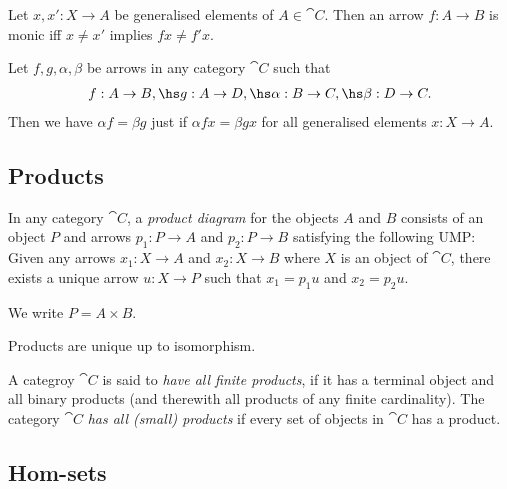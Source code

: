 \documentclass{article}
\begin{document}
\begin{lemma}
	Let $x,x': X\to A$ be generalised elements of $A\in\cat C$. Then an arrow
	$f:A\to B$ is monic iff $x\not=x'$ implies $fx\not=f'x$.
\end{lemma}

\begin{lemma}
	Let $f,g,\alpha,\beta$ be arrows in any category $\cat C$ such that
	\begin{align*}
		f:A\to B,\hs g:A\to D,\hs \alpha:B\to C,\hs \beta:D\to C.
	\end{align*}
	Then we have $\alpha f=\beta g$ just if $\alpha f x = \beta g x$ for all generalised
	elements $x:X\to A$.
\end{lemma}

\subsection{Products}

\begin{definition}
	In any category $\cat C$, a \emph{product diagram} for the objects $A$
	and $B$ consists of an object $P$ and arrows $p_1:P\to A$ and $p_2:P\to B$
	satisfying the following UMP: Given any arrows $x_1:X\to A$ and $x_2:X\to B$
	where $X$ is an object of $\cat C$, there exists a unique arrow $u:X\to P$
	such that $x_1=p_1u$ and $x_2=p_2u$.
	\begin{center}
	\end{center}
	We write $P=A\times B$.
\end{definition}

\begin{theorem}[Awodey 2.17]
	Products are unique up to isomorphism.
\end{theorem}

\begin{definition}[Awodey 2.19]
	A categroy $\cat C$ is said to \emph{have all finite products}, if it has a
	terminal object and all binary products (and therewith all products of any
	finite cardinality). The category $\cat C$ \emph{has all (small) products}
	if every set of objects in $\cat C$ has a product.
\end{definition}

\subsection{Hom-sets}
\end{document}

